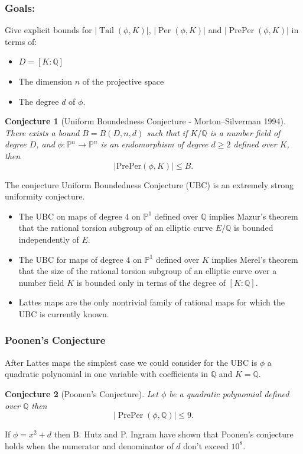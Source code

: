 \documentclass{beamer}
\def\jump{ \quad \\ \vspace{0.7cm} \pause}
\def\PP{{\mathbb P}}
\def\QQ{{\mathbb Q}}
\DeclareMathOperator{\Tail}{Tail}
\DeclareMathOperator{\Per}{Per}
\DeclareMathOperator{\PrePer}{PrePer}
\theoremstyle{thmstyle}
\theoremstyle{thmstyle}
\theoremstyle{mystyle}
\newtheorem*{conjecture}{Conjecture}
\theoremstyle{qstnstyle}
\begin{document}
\begin{frame}
\frametitle{Goals:}
Give explicit bounds for $|\Tail(\phi,K)|$, $|\Per(\phi,K)|$ and $|\PrePer(\phi,K)|$ in terms of:\pause
\begin{itemize}
\item  $D=[K: \QQ]$\pause 

\item The dimension $n$ of the projective space \pause 

\item The degree $d$ of $\phi$.
\end{itemize}

\pause

\begin{conjecture}[Uniform Boundedness Conjecture - Morton--Silverman
  1994]
There exists a bound $B = B(D,n,d)$ such that if $K/\mathbb{Q}$ is a number field of degree $D$, and $\phi:\mathbb{P}^n\rightarrow\mathbb{P}^n$ is an endomorphism of degree $d\geq{2}$ defined over $K$, then 
$$|\text{PrePer}(\phi,K)| \leq B.$$
\end{conjecture}
\end{frame}

\begin{frame}
The conjecture Uniform Boundedness Conjecture (UBC) is an extremely strong uniformity conjecture.
\jump
\begin{itemize}
\item The UBC on maps of degree $4$ on $\PP^1$ defined over $\QQ$ implies Mazur's theorem that the rational torsion subgroup of
an elliptic curve $E/\QQ$ is bounded independently of $E$.
\jump
\item The UBC for maps of degree $4$ on $\PP^1$ defined over $K$ implies Merel's theorem that the size of the rational torsion subgroup
of an elliptic curve over a number field $K$ is bounded only in terms of the degree of $[K : \QQ]$.
\jump
\item  Lattes maps are the only nontrivial family of rational maps for which the UBC is currently known.
\end{itemize}


\end{frame}


\begin{frame}
\frametitle{Poonen's Conjecture}

After Lattes maps the simplest case we could consider for the UBC is \pause  $\phi$ a quadratic polynomial in one variable with coefficients in $\QQ$ and $K=\QQ$.

\pause
\vspace{4mm}


\begin{conjecture}[Poonen's Conjecture]
Let $\phi$ be a quadratic polynomial defined over $\mathbb{Q}$ then 
$$|\PrePer(\phi,\QQ)| \leq 9.$$
\end{conjecture}

\pause
\vspace{6mm}

If $\phi=x^2+d$ then B. Hutz and P. Ingram have shown that Poonen's conjecture holds when the numerator and denominator of $d$ don't exceed $10^8$.

\end{frame}
\end{document}
